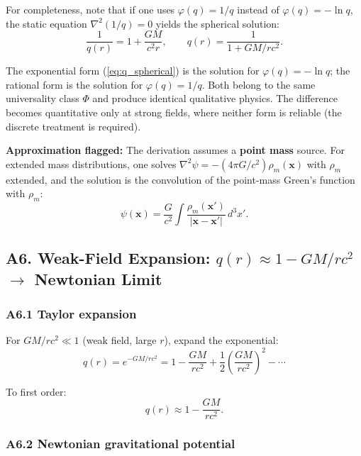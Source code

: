 \documentclass[reprint]{revtex4-2}
\begin{document}
For completeness, note that if one uses $\varphi(q)=1/q$ instead of $\varphi(q)=-\ln q$, the static equation $\nabla^2(1/q)=0$ yields the spherical solution:
\begin{equation}
\frac{1}{q(r)} = 1 + \frac{GM}{c^2 r}, \qquad q(r) = \frac{1}{1 + GM/rc^2}.
\end{equation}

The exponential form (\ref{eq:q_spherical}) is the solution for $\varphi(q)=-\ln q$; the rational form is the solution for $\varphi(q)=1/q$. Both belong to the same universality class $\Phi$ and produce identical qualitative physics. The difference becomes quantitative only at strong fields, where neither form is reliable (the discrete treatment is required).

\textbf{Approximation flagged:} The derivation assumes a \textbf{point mass} source. For extended mass distributions, one solves $\nabla^2\psi = -(4\pi G/c^2)\rho_m(\mathbf{x})$ with $\rho_m$ extended, and the solution is the convolution of the point-mass Green's function with $\rho_m$:
\begin{equation}
\psi(\mathbf{x}) = \frac{G}{c^2}\int \frac{\rho_m(\mathbf{x}')}{|\mathbf{x}-\mathbf{x}'|}\,d^3x'.
\end{equation}

\subsection{A6. Weak-Field Expansion: $q(r)\approx 1-GM/rc^2$ $\to$ Newtonian Limit}

\subsubsection{A6.1 Taylor expansion}

For $GM/rc^2 \ll 1$ (weak field, large $r$), expand the exponential:
\begin{equation}
q(r) = e^{-GM/rc^2} = 1 - \frac{GM}{rc^2} + \frac{1}{2}\left(\frac{GM}{rc^2}\right)^2 - \cdots
\end{equation}

To first order:
\begin{equation}
\boxed{q(r) \approx 1 - \frac{GM}{rc^2}}.
\label{eq:weak_field}
\end{equation}

\subsubsection{A6.2 Newtonian gravitational potential}
\end{document}
